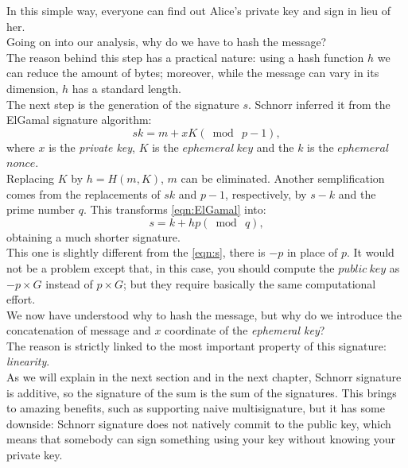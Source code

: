 In this simple way, everyone can find out Alice's private key and sign in lieu of her.\\
Going on into our analysis, why do we have to hash the message? \\
The reason behind this step has a practical nature: using a hash function $h$ we can reduce the amount of bytes; moreover, while the message can vary in its dimension, $h$ has a standard length.\\
The next step is the generation of the signature $s$. Schnorr inferred it from the ElGamal signature algorithm:
\begin{equation}
\label{eqn:ElGamal}
sk=m+xK (\bmod\ p-1),
\end{equation}
where $x$ is the \textit{private key}, $K$ is the $ephemeral\ key$ and the $k$ is the $ephemeral$ $nonce$.\\
Replacing $K$ by $h=H(m,K)$, $m$ can be eliminated. Another semplification comes from the replacements of $sk$ and $p-1$, respectively, by $s-k$ and the prime number $q$. This transforms \eqref{eqn:ElGamal} into:
\begin{equation}
s=k+hp (\bmod\ q),
\end{equation}
obtaining a much shorter signature.\\
This one is slightly different from the \eqref{eqn:s}, there is $-p$ in place of $p$. It would not be a problem except that, in this case, you should compute the $public\ key$ as $-p \times G$ instead of $p \times G$; but they require basically the same computational effort.\\
We now have understood why to hash the message, but why do we introduce the concatenation of message and $x$ coordinate of the \textit{ephemeral key}?\\
The reason is strictly linked to the most important property of this signature: \textit{linearity}.\\
As we will explain in the next section and in the next chapter, Schnorr signature is additive, so the signature of the sum is the sum of the signatures. This brings to amazing benefits, such as supporting naive multisignature, but it has some downside: Schnorr signature does not natively commit to the public key, which means that somebody can sign something using your key without knowing your private key. 
